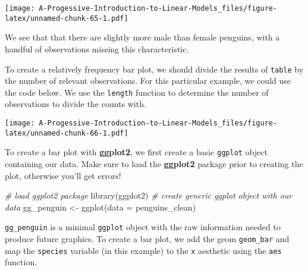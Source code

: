 \documentclass[
]{book}
\newenvironment{Shaded}{\begin{snugshade}}{\end{snugshade}}
\newcommand{\AttributeTok}[1]{\textcolor[rgb]{0.77,0.63,0.00}{#1}}
\newcommand{\CommentTok}[1]{\textcolor[rgb]{0.56,0.35,0.01}{\textit{#1}}}
\newcommand{\FunctionTok}[1]{\textcolor[rgb]{0.00,0.00,0.00}{#1}}
\newcommand{\NormalTok}[1]{#1}
\newcommand{\OtherTok}[1]{\textcolor[rgb]{0.56,0.35,0.01}{#1}}
\newcommand{\SpecialCharTok}[1]{\textcolor[rgb]{0.00,0.00,0.00}{#1}}
\newcommand{\StringTok}[1]{\textcolor[rgb]{0.31,0.60,0.02}{#1}}
\theoremstyle{definition}
\theoremstyle{definition}
\theoremstyle{definition}
\theoremstyle{definition}
\theoremstyle{remark}
\begin{document}
\texttt{[image: A-Progessive-Introduction-to-Linear-Models\_files/figure-latex/unnamed-chunk-65-1.pdf]}

We see that that there are slightly more male than female penguins, with a handful of observations missing this characteristic.

To create a relatively frequency bar plot, we should divide the results of \texttt{table} by the number of relevant observations. For this particular example, we could use the code below. We use the \texttt{length} function to determine the number of observations to divide the counts with.

\begin{Shaded}
\end{Shaded}

\texttt{[image: A-Progessive-Introduction-to-Linear-Models\_files/figure-latex/unnamed-chunk-66-1.pdf]}

To create a bar plot with \textbf{ggplot2}, we first create a basic \texttt{ggplot} object containing our data. Make sure to load the \textbf{ggplot2} package prior to creating the plot, otherwise you'll get errors!

\begin{Shaded}
\begin{Highlighting}[]
\CommentTok{\# load ggplot2 package}
\FunctionTok{library}\NormalTok{(ggplot2)}
\CommentTok{\# create generic ggplot object with our data}
\NormalTok{gg\_penguin }\OtherTok{\textless{}{-}} \FunctionTok{ggplot}\NormalTok{(}\AttributeTok{data =}\NormalTok{ penguins\_clean)}
\end{Highlighting}
\end{Shaded}

\texttt{gg\_penguin} is a minimal \texttt{ggplot} object with the raw information needed to produce future graphics. To create a bar plot, we add the geom \texttt{geom\_bar} and map the \texttt{species} variable (in this example) to the \texttt{x} aesthetic using the \texttt{aes} function.
\end{document}

